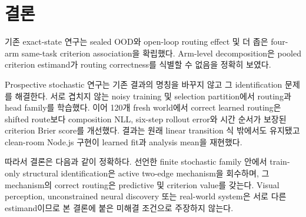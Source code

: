 \section{결론}
\label{sec:conclusion}

기존 exact-state 연구는 sealed OOD와 open-loop routing effect 및 더 좁은 four-arm
same-task criterion association을 확립했다. Arm-level decomposition은 pooled
criterion estimand가 routing correctness를 식별할 수 없음을 정확히 보였다.

Prospective stochastic 연구는 기존 결과의 명칭을 바꾸지 않고 그 identification
문제를 해결한다. 서로 겹치지 않는 noisy training 및 selection partition에서
routing과 head family를 학습했다. 이어 120개 fresh world에서 correct learned
routing은 shifted route보다 composition NLL, six-step rollout error와 시간 순서가
보장된 criterion Brier score를 개선했다. 결과는 원래 linear transition 식 밖에서도
유지됐고 clean-room Node.js 구현이 learned fit과 analysis mean을 재현했다.

따라서 결론은 다음과 같이 정확하다. 선언한 finite stochastic family 안에서
train-only structural identification은 active two-edge mechanism을 회수하며, 그
mechanism의 correct routing은 predictive 및 criterion value를 갖는다. Visual
perception, unconstrained neural discovery 또는 real-world system은 서로 다른
estimand이므로 본 결론에 붙은 미해결 조건으로 주장하지 않는다.

